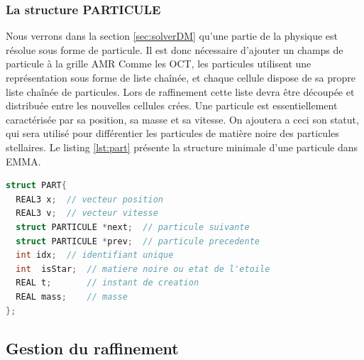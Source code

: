 \subsubsection{La structure PARTICULE}
\label{sec:PART}

Nous verrons dans la section \ref{sec:solverDM} qu'une partie de la physique est résolue sous forme de particule.
Il est donc nécessaire d'ajouter un champs de particule à la grille \ac{AMR}
Comme les OCT, les particules utilisent une représentation sous forme de liste chaînée, et chaque cellule dispose de sa propre liste chaînée de particules.
Lors de raffinement cette liste devra être découpée et distribuée entre les nouvelles cellules crées.
Une particule est essentiellement caractérisée par sa position, sa masse et sa vitesse.
On ajoutera a ceci son statut, qui sera utilisé pour différentier les particules de matière noire des particules stellaires. 
Le listing \ref{lst:part} présente la structure minimale d'une particule dans EMMA.


\begin{lstlisting}[float=bth,language=C,frame=tb,caption={La structure PARTICULE de EMMA},label=lst:part]
struct PART{
  REAL3 x;  // vecteur position
  REAL3 v;  // vecteur vitesse
  struct PARTICULE *next;  // particule suivante
  struct PARTICULE *prev;  // particule precedente
  int idx;  // identifiant unique
  int  isStar;  // matiere noire ou etat de l'etoile
  REAL t;       // instant de creation
  REAL mass;    // masse
};
\end{lstlisting}



\subsection{Gestion du raffinement}
\label{sec:raffinement}

